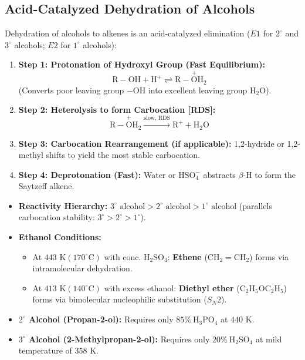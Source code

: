 \documentclass[10pt,twoside,openright]{book}
\begin{document}
\subsection{Acid-Catalyzed Dehydration of Alcohols}

\begin{conceptbox}
Dehydration of alcohols to alkenes is an acid-catalyzed elimination ($E1$ for $2^\circ$ and $3^\circ$ alcohols; $E2$ for $1^\circ$ alcohols):
\begin{enumerate}[leftmargin=*]
  \item \textbf{Step 1: Protonation of Hydroxyl Group (Fast Equilibrium):}
  \begin{equation}
    \mathrm{R-OH} + \mathrm{H^+} \rightleftharpoons \mathrm{R-\overset{+}{O}H_2}
  \end{equation}
  (Converts poor leaving group $-\mathrm{OH}$ into excellent leaving group $\mathrm{H_2O}$).
  \item \textbf{Step 2: Heterolysis to form Carbocation [RDS]:}
  \begin{equation}
    \mathrm{R-\overset{+}{O}H_2} \xrightarrow{\text{slow, RDS}} \mathrm{R}^+ + \mathrm{H_2O}
  \end{equation}
  \item \textbf{Step 3: Carbocation Rearrangement (if applicable):} 1,2-hydride or 1,2-methyl shifts to yield the most stable carbocation.
  \item \textbf{Step 4: Deprotonation (Fast):} Water or $\mathrm{HSO_4^-}$ abstracts $\beta$-H to form the Saytzeff alkene.
\end{enumerate}
\end{conceptbox}

\begin{ncertbox}
\begin{itemize}
  \item \textbf{Reactivity Hierarchy:} $3^\circ \text{ alcohol} > 2^\circ \text{ alcohol} > 1^\circ \text{ alcohol}$ (parallels carbocation stability: $3^\circ > 2^\circ > 1^\circ$).
  \item \textbf{Ethanol Conditions:}
  \begin{itemize}
    \item At $443\text{ K} (170^\circ\mathrm{C})$ with conc. $\mathrm{H_2SO_4}$: \textbf{Ethene} ($\mathrm{CH_2=CH_2}$) forms via intramolecular dehydration.
    \item At $413\text{ K} (140^\circ\mathrm{C})$ with excess ethanol: \textbf{Diethyl ether} ($\mathrm{C_2H_5OC_2H_5}$) forms via bimolecular nucleophilic substitution ($S_N2$).
  \end{itemize}
  \item \textbf{$2^\circ$ Alcohol (Propan-2-ol):} Requires only $85\% \ \mathrm{H_3PO_4}$ at $440\text{ K}$.
  \item \textbf{$3^\circ$ Alcohol (2-Methylpropan-2-ol):} Requires only $20\% \ \mathrm{H_2SO_4}$ at mild temperature of $358\text{ K}$.
\end{itemize}
\end{ncertbox}
\end{document}
